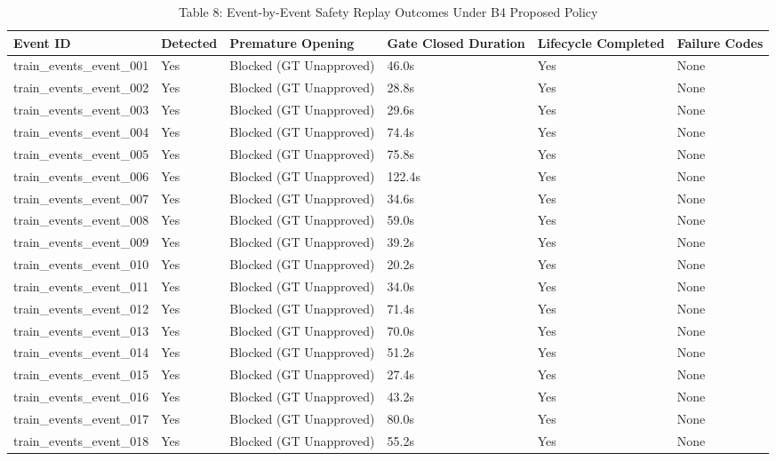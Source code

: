 \begin{table}[t]
\centering
\caption{Table 8: Event-by-Event Safety Replay Outcomes Under B4 Proposed Policy}
\label{tab:table08_multimodal_fusion_b4}
\begin{tabular}{llllll}
\hline
Event ID & Detected & Premature Opening & Gate Closed Duration & Lifecycle Completed & Failure Codes \\
\hline
train\_events\_event\_001 & Yes & Blocked (GT Unapproved) & 46.0s & Yes & None \\
train\_events\_event\_002 & Yes & Blocked (GT Unapproved) & 28.8s & Yes & None \\
train\_events\_event\_003 & Yes & Blocked (GT Unapproved) & 29.6s & Yes & None \\
train\_events\_event\_004 & Yes & Blocked (GT Unapproved) & 74.4s & Yes & None \\
train\_events\_event\_005 & Yes & Blocked (GT Unapproved) & 75.8s & Yes & None \\
train\_events\_event\_006 & Yes & Blocked (GT Unapproved) & 122.4s & Yes & None \\
train\_events\_event\_007 & Yes & Blocked (GT Unapproved) & 34.6s & Yes & None \\
train\_events\_event\_008 & Yes & Blocked (GT Unapproved) & 59.0s & Yes & None \\
train\_events\_event\_009 & Yes & Blocked (GT Unapproved) & 39.2s & Yes & None \\
train\_events\_event\_010 & Yes & Blocked (GT Unapproved) & 20.2s & Yes & None \\
train\_events\_event\_011 & Yes & Blocked (GT Unapproved) & 34.0s & Yes & None \\
train\_events\_event\_012 & Yes & Blocked (GT Unapproved) & 71.4s & Yes & None \\
train\_events\_event\_013 & Yes & Blocked (GT Unapproved) & 70.0s & Yes & None \\
train\_events\_event\_014 & Yes & Blocked (GT Unapproved) & 51.2s & Yes & None \\
train\_events\_event\_015 & Yes & Blocked (GT Unapproved) & 27.4s & Yes & None \\
train\_events\_event\_016 & Yes & Blocked (GT Unapproved) & 43.2s & Yes & None \\
train\_events\_event\_017 & Yes & Blocked (GT Unapproved) & 80.0s & Yes & None \\
train\_events\_event\_018 & Yes & Blocked (GT Unapproved) & 55.2s & Yes & None \\

\end{tabular}
\end{table}
